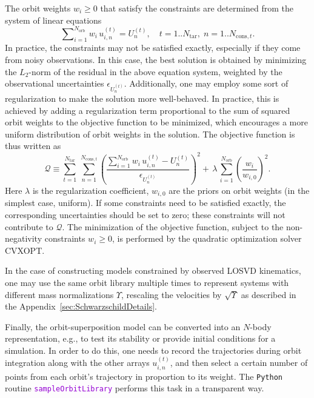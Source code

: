 \documentclass[12pt]{article}
\newcommand{\Python}{\texttt{Python}\xspace}
\newcommand{\ttt}[1]{\textcolor{darkviolet}{\texttt{#1}}}
\begin{document}
The orbit weights $w_i\ge 0$ that satisfy the constraints are determined from the system of linear equations
\begin{equation*}
\sum\nolimits_{i=1}^{N_\mathrm{orb}} w_i\, u_{i,n}^{(t)} = U_n^{(t)},\quad
t=1..N_\mathrm{tar}, \; n=1..N_{\mathrm{cons},t} .
\end{equation*}
In practice, the constraints may not be satisfied exactly, especially if they come from noisy observations. In this case, the best solution is obtained by minimizing the $L_2$-norm of the residual in the above equation system, weighted by the observational uncertainties $\epsilon_{U_n^{(t)}}$. Additionally, one may employ some sort of regularization to make the solution more well-behaved. In practice, this is achieved by adding a regularization term proportional to the sum of squared orbit weights to the objective function to be minimized, which encourages a more uniform distribution of orbit weights in the solution. The objective function is thus written as
\begin{equation*}
\mathcal Q \equiv \sum_{t=1}^{N_\mathrm{tar}}\, \sum_{n=1}^{N_{\mathrm{cons},t}} 
\left(
\frac{ \sum_{i=1}^{N_\mathrm{orb}} w_i\, u_{i,n}^{(t)} - U_n^{(t)} }{ \epsilon_{U_n^{(t)}} }
\right)^2 +\,
\lambda\,\sum_{i=1}^{N_\mathrm{orb}} \left(\frac{w_i}{w_{i,0}}\right)^2.
\end{equation*}
Here $\lambda$ is the regularization coefficient, $w_{i,0}$ are the priors on orbit weights (in the simplest case, uniform). If some constraints need to be satisfied exactly, the corresponding uncertainties should be set to zero; these constraints will not contribute to $\mathcal Q$. The minimization of the objective function, subject to the non-negativity constraints $w_i\ge 0$, is performed by the quadratic optimization solver CVXOPT.

In the case of constructing models constrained by observed LOSVD kinematics, one may use the same orbit library multiple times to represent systems with different mass normalizations $\Upsilon$, rescaling the velocities by $\sqrt{\Upsilon}$ as described in the Appendix~\ref{sec:SchwarzschildDetails}.

Finally, the orbit-superposition model can be converted into an $N$-body representation, e.g., to test its stability or provide initial conditions for a simulation. In order to do this, one needs to record the trajectories during orbit integration along with the other arrays $u_{i,n}^{(t)}$, and then select a certain number of points from each orbit's trajectory in proportion to its weight. The \Python routine \ttt{sampleOrbitLibrary} performs this task in a transparent way.
\end{document}
